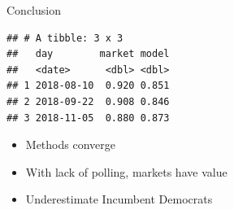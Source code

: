 \documentclass[ignorenonframetext,]{beamer}
\providecommand{\tightlist}{%
  \setlength{\itemsep}{0pt}\setlength{\parskip}{0pt}}
\begin{document}
\begin{frame}[fragile]{Conclusion}

\begin{verbatim}
## # A tibble: 3 x 3
##   day        market model
##   <date>      <dbl> <dbl>
## 1 2018-08-10  0.920 0.851
## 2 2018-09-22  0.908 0.846
## 3 2018-11-05  0.880 0.873
\end{verbatim}

\begin{itemize}
\tightlist
\item
  Methods converge
\item
  With lack of polling, markets have value
\item
  Underestimate Incumbent Democrats
\end{itemize}

\end{frame}
\end{document}

